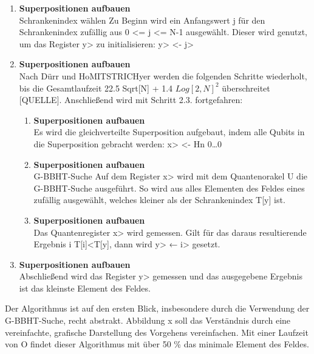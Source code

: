\begin{enumerate}
    \item \textbf{Superpositionen aufbauen}
    \\
    Schrankenindex wählen
    Zu Beginn wird ein Anfangswert j für den Schrankenindex zufällig aus 0 <= j <= N-1 ausgewählt. Dieser wird genutzt, um das Register y> zu initialisieren: y> <- j>

    \item \textbf{Superpositionen aufbauen}
    \\
    Nach Dürr und HoMITSTRICHyer werden die folgenden Schritte wiederholt, bis die Gesamtlaufzeit 22.5 Sqrt[N] + 1.4 $Log[2,N]^2$ überschreitet [QUELLE]. Anschließend wird mit Schritt 2.3. fortgefahren:
    \begin{enumerate}
        \item \textbf{Superpositionen aufbauen}
        \\
        Es wird die gleichverteilte Superposition aufgebaut, indem alle Qubits in die Superposition gebracht werden:
        x> <- Hn 0…0  
        \item \textbf{Superpositionen aufbauen}
        \\
        G-BBHT-Suche
        Auf dem Register x> wird mit dem Quantenorakel U die G-BBHT-Suche ausgeführt. So wird aus alles Elementen des Feldes eines zufällig ausgewählt, welches kleiner als der Schrankenindex T[y] ist.
        \item \textbf{Superpositionen aufbauen}
        \\
        Das Quantenregister x> wird gemessen. Gilt für das daraus resultierende Ergebnis i T[i]<T[y], dann wird y> ← i>  gesetzt.
    \end{enumerate}

    \item \textbf{Superpositionen aufbauen}
    \\
    Abschließend wird das Register y> gemessen und das ausgegebene Ergebnis ist das kleinste Element des Feldes.
\end{enumerate}

Der Algorithmus ist auf den ersten Blick, insbesondere durch die Verwendung der G-BBHT-Suche, recht abstrakt. Abbildung x soll das Verständnis  durch eine vereinfachte, grafische Darstellung des Vorgehens vereinfachen. Mit einer Laufzeit von O findet dieser Algorithmus mit über 50 \% das minimale Element des Feldes.
